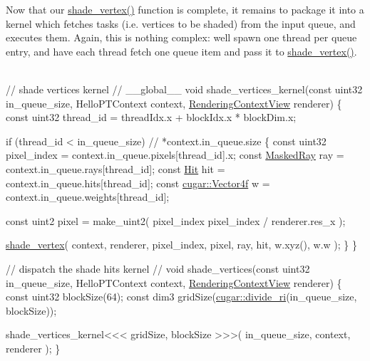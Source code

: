 \begin{DoxyParagraph}{}
Now that our \hyperlink{_hello_renderer_page_shade_vertex_anchor}{shade\+\_\+vertex()} function is complete, it remains to package it into a kernel which fetches tasks (i.\+e. vertices to be shaded) from the input queue, and executes them. Again, this is nothing complex\+: we\textquotesingle{}ll spawn one thread per queue entry, and have each thread fetch one queue item and pass it to \hyperlink{_hello_renderer_page_shade_vertex_anchor}{shade\+\_\+vertex()}. \label{_hello_renderer_page_shade_vertices_anchor}%
%
 ~\newline
 
\begin{DoxyCodeInclude}
\textcolor{comment}{// shade vertices kernel}
\textcolor{comment}{//}
\_\_global\_\_
\textcolor{keywordtype}{void} shade\_vertices\_kernel(\textcolor{keyword}{const} uint32 in\_queue\_size, HelloPTContext context, 
      \hyperlink{struct_rendering_context_view}{RenderingContextView} renderer)
\{
    \textcolor{keyword}{const} uint32 thread\_id = threadIdx.x + blockIdx.x * blockDim.x;

    \textcolor{keywordflow}{if} (thread\_id < in\_queue\_size) \textcolor{comment}{// *context.in\_queue.size}
    \{
        \textcolor{keyword}{const} uint32          pixel\_index       = context.in\_queue.pixels[thread\_id].x;
        \textcolor{keyword}{const} \hyperlink{struct_masked_ray}{MaskedRay}          ray               = context.in\_queue.rays[thread\_id];
        \textcolor{keyword}{const} \hyperlink{struct_hit}{Hit}              hit               = context.in\_queue.hits[thread\_id];
        \textcolor{keyword}{const} \hyperlink{structcugar_1_1_vector}{cugar::Vector4f} w                  = context.in\_queue.weights[thread\_id];

        \textcolor{keyword}{const} uint2 pixel = make\_uint2(
            pixel\_index %
            pixel\_index / renderer.res\_x
        );

        \hyperlink{group___p_t_lib_core_ga9b8be237ade285e6db792a9ea7bf900e}{shade\_vertex}(
            context,
            renderer,
            pixel\_index,
            pixel,
            ray,
            hit,
            w.xyz(),
            w.w );
    \}
\}

\textcolor{comment}{// dispatch the shade hits kernel}
\textcolor{comment}{//}
\textcolor{keywordtype}{void} shade\_vertices(\textcolor{keyword}{const} uint32 in\_queue\_size, HelloPTContext context, 
      \hyperlink{struct_rendering_context_view}{RenderingContextView} renderer)
\{
    \textcolor{keyword}{const} uint32 blockSize(64);
    \textcolor{keyword}{const} dim3 gridSize(\hyperlink{group___basic_utils_gabb6714186dbbd864f0a9298944ba509b}{cugar::divide\_ri}(in\_queue\_size, blockSize));

    shade\_vertices\_kernel<<< gridSize, blockSize >>>( in\_queue\_size, context, renderer );
\}
\end{DoxyCodeInclude}
 
\end{DoxyParagraph}
